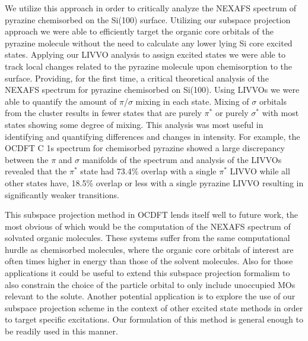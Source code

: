 \documentclass{article}
\begin{document}
We utilize this approach in order to critically analyze the NEXAFS spectrum of pyrazine chemisorbed on the Si(100) surface. Utilizing our subspace projection approach we were able to efficiently target the organic core orbitals of the pyrazine molecule without the need to calculate any lower lying Si core excited states. Applying our LIVVO analysis to assign excited states we were able to track local changes related to the pyrazine molecule upon chemisorption to the surface. Providing, for the first time, a critical theoretical analysis of the NEXAFS spectrum for pyrazine chemisorbed on Si(100). Using LIVVOs we were able to quantify the amount of $\pi$/$\sigma$ mixing in each state. Mixing of $\sigma$ orbitals from the cluster results in fewer states that are purely $\pi^*$ or purely $\sigma^*$
with most states showing some degree of mixing. This analysis was most useful in identifying and quantifying differences and changes in intensity. For example, the OCDFT C 1s spectrum for chemisorbed pyrazine showed a large discrepancy between the $\pi$ and $\sigma$ manifolds of the spectrum and analysis of the LIVVOs revealed that the $\pi^*$ state had 73.4\% overlap with a single $\pi^*$ LIVVO while all other states have, 18.5\% overlap or less with a single pyrazine LIVVO resulting in significantly weaker transitions.  

This subspace projection method in OCDFT lends itself well to future work, the most obvious of which would be the computation of the NEXAFS spectrum of solvated organic molecules. These systems suffer from the same computational hurdle as chemisorbed molecules, where the organic core orbitals of interest are often times higher in energy than those of the solvent molecules. Also for those applications it could be useful to extend this subspace projection formalism to also constrain the choice of the particle orbital to only include unoccupied MOs relevant to the solute. Another potential application is to explore the use of our subspace projection scheme in the context of other excited state methods in order to target specific excitations. Our formulation of this method is general enough to be readily used in this manner. 

\renewcommand{\theequation}{A\arabic{equation}}    
\setcounter{equation}{0}  %
  
\end{document}
